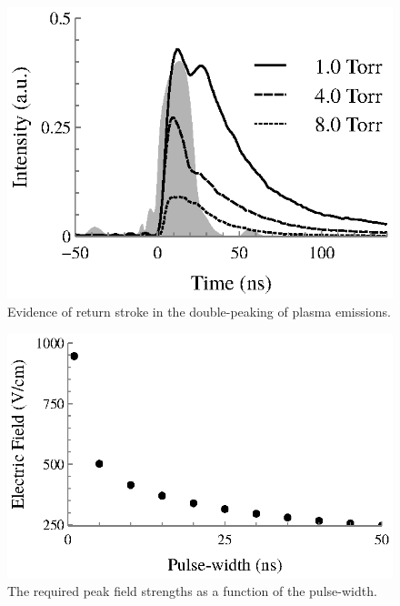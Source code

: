 \begin{figure}
  \centering
  \includegraphics{./chapters/modeling/figures/double.eps}
  \caption{Evidence of return stroke in the double-peaking of plasma emissions.}
  \label{fig:double}
\end{figure}

\begin{figure}
  \centering
  \includegraphics{./chapters/modeling/figures/fieldtau.eps}
  \caption{The required peak field strengths as a function of the pulse-width.}
  \label{fig:fieldtau.eps}
\end{figure}
 
